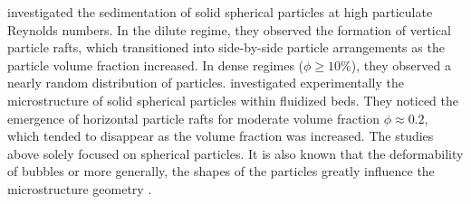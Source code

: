 \citet{shajahan2023inertial} investigated the sedimentation of solid spherical particles at high particulate Reynolds numbers.
In the dilute regime, they observed the formation of vertical particle rafts, which transitioned into side-by-side particle arrangements as the particle volume fraction increased. In dense regimes ($\phi \geq 10 \%$), they observed a nearly random distribution of particles. %
\citet{almeras2021statistics} investigated experimentally the microstructure of solid spherical particles within fluidized beds. They noticed the emergence of horizontal particle rafts for moderate volume fraction $\phi \approx 0.2$, which tended to disappear as the volume fraction was increased.  %
The studies above solely focused on spherical particles.
It is also known that the deformability of bubbles or more generally, the shapes of the particles greatly influence the microstructure geometry \citep{bunner2003effect,seyed2021sedimentation}. 

